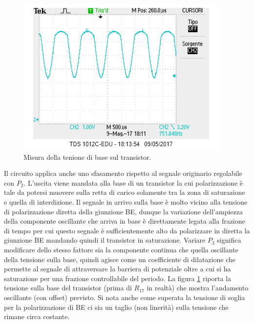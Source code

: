 \documentclass[10pt,a4paper]{article}
\begin{document}
\begin{figure}[!htb]
  \centering
\includegraphics[scale=0.7]{baseq2.png}
\caption{Misura della tenione di base sul transistor.\label{base}}
\end{figure}


Il circuito applica anche uno sfasamento rispetto al segnale originario regolabile con $P_2$. L'uscita viene mandata alla base di un transistor la cui polarizzazione è tale da potersi muovere sulla retta di carico solamente  tra la zona di saturazione e quella di interdizione. Il segnale in arrivo sulla base è molto vicino alla tensione di polarizzazione diretta della giunzione BE, dunque la variazione dell'ampiezza della componente oscillante che arriva in base è direttamente legata alla frazione di tempo per cui questo segnale è sufficientemente alto da polarizzare in diretta la giunzione BE mandando quindi il transistor in saturazione. Variare $P_3$ significa modificare dello stesso fattore sia la componente continua che quella oscillante della tensione sulla base, quindi agisce come un coefficiente di dilatazione che permette al segnale di attraversare la barriera di potenziale oltre a cui si ha saturazione per una frazione controllabile del periodo. La figura \ref{base} riporta la tensione sulla base del transistor (prima di $R_{17}$ in realtà) che mostra l'andamento oscillante (con offset) previsto. Si nota anche come superata la tensione di soglia per la polarizzazione di BE ci sia un taglio (non linerità) sulla tensione che rimane circa costante. 

\end{document}
